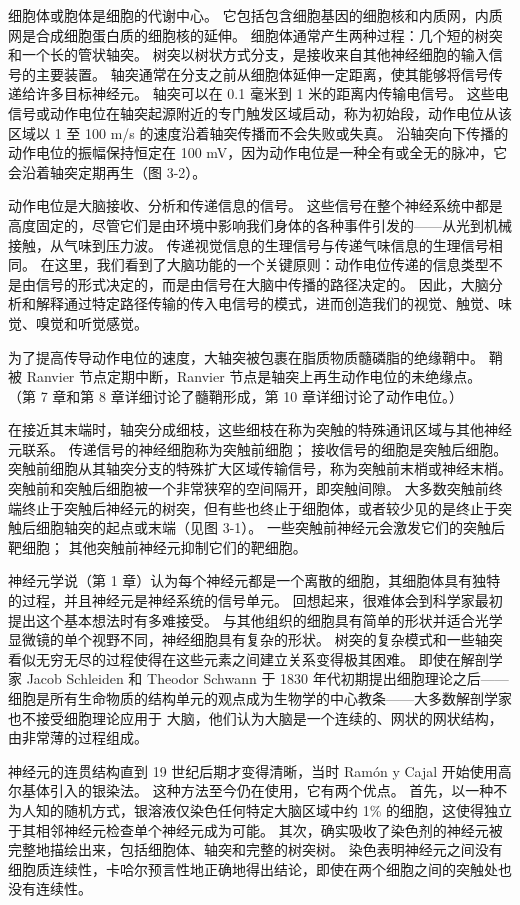 细胞体或胞体是细胞的代谢中心。 它包括包含细胞基因的细胞核和内质网，内质网是合成细胞蛋白质的细胞核的延伸。 细胞体通常产生两种过程：几个短的树突和一个长的管状轴突。 树突以树状方式分支，是接收来自其他神经细胞的输入信号的主要装置。 轴突通常在分支之前从细胞体延伸一定距离，使其能够将信号传递给许多目标神经元。 轴突可以在 0.1 毫米到 1 米的距离内传输电信号。 这些电信号或动作电位在轴突起源附近的专门触发区域启动，称为初始段，动作电位从该区域以 1 至 100 m/s 的速度沿着轴突传播而不会失败或失真。 沿轴突向下传播的动作电位的振幅保持恒定在 100 mV，因为动作电位是一种全有或全无的脉冲，它会沿着轴突定期再生（图 3-2）。

动作电位是大脑接收、分析和传递信息的信号。 这些信号在整个神经系统中都是高度固定的，尽管它们是由环境中影响我们身体的各种事件引发的——从光到机械接触，从气味到压力波。 传递视觉信息的生理信号与传递气味信息的生理信号相同。 在这里，我们看到了大脑功能的一个关键原则：动作电位传递的信息类型不是由信号的形式决定的，而是由信号在大脑中传播的路径决定的。 因此，大脑分析和解释通过特定路径传输的传入电信号的模式，进而创造我们的视觉、触觉、味觉、嗅觉和听觉感觉。

为了提高传导动作电位的速度，大轴突被包裹在脂质物质髓磷脂的绝缘鞘中。 鞘被 Ranvier 节点定期中断，Ranvier 节点是轴突上再生动作电位的未绝缘点。 （第 7 章和第 8 章详细讨论了髓鞘形成，第 10 章详细讨论了动作电位。）

在接近其末端时，轴突分成细枝，这些细枝在称为突触的特殊通讯区域与其他神经元联系。 传递信号的神经细胞称为突触前细胞； 接收信号的细胞是突触后细胞。 突触前细胞从其轴突分支的特殊扩大区域传输信号，称为突触前末梢或神经末梢。 突触前和突触后细胞被一个非常狭窄的空间隔开，即突触间隙。 大多数突触前终端终止于突触后神经元的树突，但有些也终止于细胞体，或者较少见的是终止于突触后细胞轴突的起点或末端（见图 3-1）。 一些突触前神经元会激发它们的突触后靶细胞； 其他突触前神经元抑制它们的靶细胞。

神经元学说（第 1 章）认为每个神经元都是一个离散的细胞，其细胞体具有独特的过程，并且神经元是神经系统的信号单元。 回想起来，很难体会到科学家最初提出这个基本想法时有多难接受。 与其他组织的细胞具有简单的形状并适合光学显微镜的单个视野不同，神经细胞具有复杂的形状。 树突的复杂模式和一些轴突看似无穷无尽的过程使得在这些元素之间建立关系变得极其困难。 即使在解剖学家 Jacob Schleiden 和 Theodor Schwann 于 1830 年代初期提出细胞理论之后——细胞是所有生命物质的结构单元的观点成为生物学的中心教条——大多数解剖学家也不接受细胞理论应用于 大脑，他们认为大脑是一个连续的、网状的网状结构，由非常薄的过程组成。

神经元的连贯结构直到 19 世纪后期才变得清晰，当时 Ramón y Cajal 开始使用高尔基体引入的银染法。 这种方法至今仍在使用，它有两个优点。 首先，以一种不为人知的随机方式，银溶液仅染色任何特定大脑区域中约 1\% 的细胞，这使得独立于其相邻神经元检查单个神经元成为可能。 其次，确实吸收了染色剂的神经元被完整地描绘出来，包括细胞体、轴突和完整的树突树。 染色表明神经元之间没有细胞质连续性，卡哈尔预言性地正确地得出结论，即使在两个细胞之间的突触处也没有连续性。

